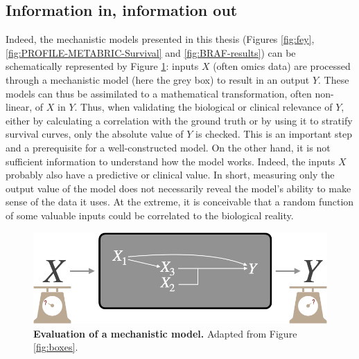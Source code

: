 \documentclass[a4paper,12pt,twoside,onecolumn,openright,final,oldfontcommands]{memoir}
\begin{document}
\subsection{Information in, information
out}\label{information-in-information-out}

Indeed, the mechanistic models presented in this thesis (Figures
\ref{fig:fey}, \ref{fig:PROFILE-METABRIC-Survival} and
\ref{fig:BRAF-results}) can be schematically represented by Figure
\ref{fig:box-mech}: inputs \(X\) (often omics data) are processed
through a mechanistic model (here the grey box) to result in an output
\(Y\). These models can thus be assimilated to a mathematical
transformation, often non-linear, of \(X\) in \(Y\). Thus, when
validating the biological or clinical relevance of \(Y\), either by
calculating a correlation with the ground truth or by using it to
stratify survival curves, only the absolute value of \(Y\) is checked.
This is an important step and a prerequisite for a well-constructed
model. On the other hand, it is not sufficient information to understand
how the model works. Indeed, the inputs \(X\) probably also have a
predictive or clinical value. In short, measuring only the output value
of the model does not necessarily reveal the model's ability to make
sense of the data it uses. At the extreme, it is conceivable that a
random function of some valuable inputs could be correlated to the
biological reality.

\begin{figure}

{\centering \includegraphics[width=0.8\linewidth]{fig/box-mech} 

}

\caption[Evaluation of a mechanistic model]{\textbf{Evaluation of a mechanistic model.}
Adapted from Figure \ref{fig:boxes}.}\label{fig:box-mech}
\end{figure}
\end{document}

